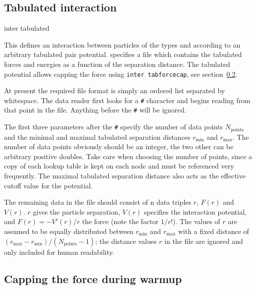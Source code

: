 \subsection{Tabulated interaction}
\label{sec:tabnonbonded}

\begin{essyntax}
  inter   tabulated %
  \begin{features}
  \end{features}
\end{essyntax}

This defines an interaction between particles of the types  and
 according to an arbitrary tabulated pair potential. 
specifies a file which contains the tabulated forces and energies as a function
of the separation distance. The tabulated potential allows capping the force
using {\tt inter tabforcecap}, see section~\ref{sec:forcecap}.

At present the required file format is simply an ordered list separated by
whitespace. The data reader first looks for a {\tt \#} character and begins
reading from that point in the file. Anything before the {\tt \#} will be
ignored.

The first three parameters after the {\tt \#} specify the number of data points
$N_\text{points}$ and the minimal and maximal tabulated separation distances
$r_\text{min}$ and $r_\text{max}$. The number of data points obviously should
be an integer, the two other can be arbitrary positive doubles. Take care when
choosing the number of points, since a copy of each lookup table is kept on each
node and must be referenced very frequently. The maximal tabulated separation
distance also acts as the effective cutoff value for the potential.

The remaining data in the file should consist of n data triples $r$, $F(r)$ and
$V(r)$. $r$ gives the particle separation, $V(r)$ specifies the interaction
potential, and $F(r)= -V'(r)/r$ the force (note the factor $1/r$!). The values
of $r$ are assumed to be equally distributed between $r_\text{min}$ and
$r_\text{max}$ with a fixed distance of
$(r_\text{max}-r_\text{min})/(N_\text{points}-1)$; the distance values $r$ in
the file are ignored and only included for human readability.

\subsection{Capping the force during warmup}
\label{sec:forcecap}

